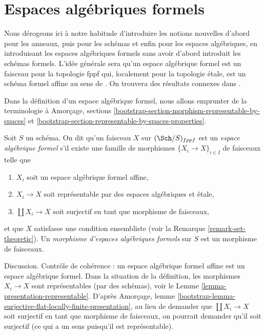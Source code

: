 \section{Espaces algébriques formels}
\label{section-formal-algebraic-spaces}

\noindent
Nous dérogeons ici à notre habitude d'introduire les notions nouvelles d'abord
pour les anneaux, puis pour les schémas et enfin pour les espaces algébriques, en
introduisant les espaces algébriques formels sans avoir d'abord introduit les
schémas formels. L'idée générale sera qu'un espace algébrique formel
est un faisceau pour la topologie fppf qui, localement pour la topologie étale, est un
schéma formel affine au sens de \cite{BVGD}.
On trouvera des résultats connexes dans \cite{Yasuda}.

\medskip\noindent
Dans la définition d'un espace algébrique formel, nous allons
emprunter de la terminologie à
Amorçage, sections
\ref{bootstrap-section-morphism-representable-by-spaces} et
\ref{bootstrap-section-representable-by-spaces-properties}.

\begin{definition}
\label{definition-formal-algebraic-space}
Soit $S$ un schéma. On dit qu'un faisceau $X$ sur $(\Sch/S)_{fppf}$ est un
{\it espace algébrique formel} s'il existe une famille de morphismes
$\{X_i \to X\}_{i \in I}$ de faisceaux telle que
\begin{enumerate}
\item $X_i$ soit un espace algébrique formel affine,
\item $X_i \to X$ soit représentable par des espaces algébriques et étale,
\item $\coprod X_i \to X$ soit surjectif en tant que morphisme de faisceaux,
\end{enumerate}
et que $X$ satisfasse une condition ensembliste
(voir la Remarque \ref{remark-set-theoretic}). Un
{\it morphisme d'espaces algébriques formels}
sur $S$ est un morphisme de faisceaux.
\end{definition}

\noindent
Discussion. Contrôle de cohérence : un espace algébrique formel affine est
un espace algébrique formel. Dans la situation de la définition,
les morphismes $X_i \to X$ sont représentables (par des schémas), voir le
Lemme \ref{lemma-presentation-representable}.
D'après Amorçage, lemme
\ref{bootstrap-lemma-surjective-flat-locally-finite-presentation},
au lieu de demander que $\coprod X_i \to X$ soit
surjectif en tant que morphisme de faisceaux, on pourrait demander qu'il soit
surjectif (ce qui a un sens puisqu'il est représentable).

